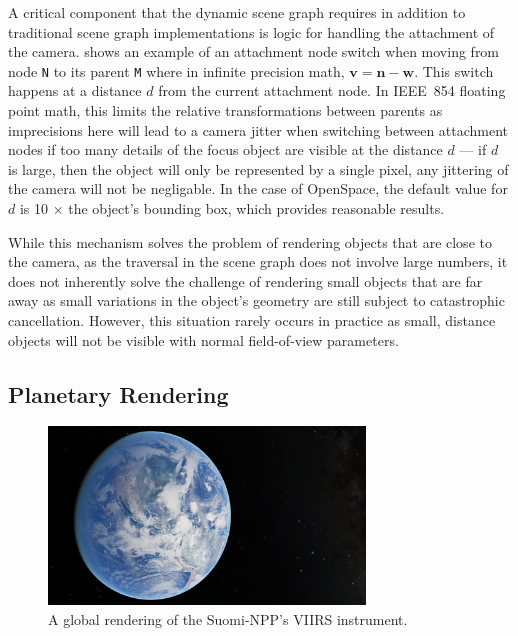 A critical component that the dynamic scene graph requires in addition to traditional scene graph implementations is logic for handling the attachment of the camera.   shows an example of an attachment node switch when moving from node \texttt{N} to its parent \texttt{M} where in infinite precision math, $\textbf{v} = \textbf{n}-\textbf{w}$.  This switch happens at a distance $d$ from the current attachment node.  In IEEE~854 floating point math, this limits the relative transformations between parents as imprecisions here will lead to a camera jitter when switching between attachment nodes if too many details of the focus object are visible at the distance $d$ --- if $d$ is large, then the object will only be represented by a single pixel, any jittering of the camera will not be negligable.  In the case of OpenSpace, the default value for $d$ is 10 $\times$ the object's bounding box, which provides reasonable results.

While this mechanism solves the problem of rendering objects that are close to the camera, as the traversal in the scene graph does not involve large numbers, it does not inherently solve the challenge of rendering small objects that are far away as small variations in the object's geometry are still subject to catastrophic cancellation.  However, this situation rarely occurs in practice as small, distance objects will not be visible with normal field-of-view parameters.



\subsection{Planetary Rendering} \label{contributions:astro:gb}
\begin{figure}
\centering
\includegraphics[width=0.75\textwidth]{figures/contributions/gb/earth.png}
\caption{A global rendering of the Suomi-NPP's VIIRS instrument.}
\label{contributions:astro:gb:earth}
\end{figure}

